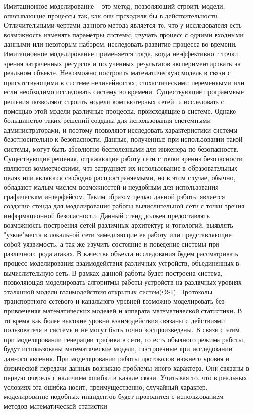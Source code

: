     Имитационное моделирование – это метод, позволяющий строить модели, описывающие процессы так, как они проходили бы в действительности. Отличительными чертами данного метода является то, что у исследователя есть возможность изменять параметры системы, изучать процесс с одними входными данными или некоторым набором, исследовать развитие процесса во времени. Имитационное моделирование применяется тогда, когда неэффективно с точки зрения затраченных ресурсов и полученных результатов экспериментировать на реальном объекте. Невозможно построить математическую модель в связи с присутствующими в системе нелинейностях, стохастическими переменными или если необходимо исследовать систему во времени. Существующие программные решения позволяют строить модели компьютерных сетей, и исследовать с помощью этой модели различные процессы, происходящие в системе. Однако большинство таких решений созданы для использования системными администраторами, и поэтому позволяют исследовать характеристики системы безотносительно к безопасности. Данные, полученные при использовании такой системы, могут быть абсолютно бесполезными для инженера по безопасности. Существующие решения, отражающие работу сети с точки зрения безопасности являются коммерческими, что затрудняет их использование в образовательных целях или являются свободно распространяемыми, но в этом случае, обычно, обладают малым числом возможностей и неудобным для использования графическим интерфейсом. Таким образом целью данной работы является создание стенда для моделирования работы вычислительной сети с точки зрения информационной безопасности. Данный стенд должен предоставлять возможность построения сетей различных архитектур и топологий, выявлять "узкие"места в локальной сети замедляющие ее работу или представляющие собой уязвимость, а так же изучить состояние и поведение системы при различного рода атаках. В качестве объекта исследования будем рассматривать процесс моделирования взаимодействия различных устройств, объединенных в вычислительную сеть. В рамках данной работы будет построена система, позволяющая моделировать алгоритмы работы устройств на различных уровнях эталонной модели взаимодействия открытых систем(OSI). Протоколы транспортного сетевого и канального уровней возможно моделировать без привлечения математических моделей и аппарата математической статистики. В то время как более высокие уровни взаимодействия связаны с действиями пользователя в системе и не могут быть точно воспроизведены. В связи с этим при моделировании генерации трафика в сети, то есть обычного режима работы, будут использованы математические модели, построенные при исследовании данного явления. При моделировании работы протоколов нижнего уровня и физической передачи данных возникаю проблемы иного характера. Они связаны в первую очередь с наличием ошибки в канале связи. Учитывая то, что в реальных условиях эта ошибка носит, преимущественно, случайный характер, моделирование подобных инцидентов будет проводится с использованием методов математической статистки.

